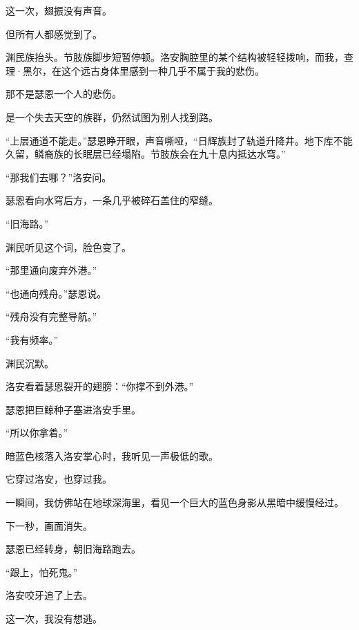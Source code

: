 这一次，翅振没有声音。

但所有人都感觉到了。

渊民族抬头。节肢族脚步短暂停顿。洛安胸腔里的某个结构被轻轻拨响，而我，查理·黑尔，在这个远古身体里感到一种几乎不属于我的悲伤。

那不是瑟恩一个人的悲伤。

是一个失去天空的族群，仍然试图为别人找到路。

“上层通道不能走。”瑟恩睁开眼，声音嘶哑，“日辉族封了轨道升降井。地下库不能久留，鳞裔族的长眠层已经塌陷。节肢族会在九十息内抵达水穹。”

“那我们去哪？”洛安问。

瑟恩看向水穹后方，一条几乎被碎石盖住的窄缝。

“旧海路。”

渊民听见这个词，脸色变了。

“那里通向废弃外港。”

“也通向残舟。”瑟恩说。

“残舟没有完整导航。”

“我有频率。”

渊民沉默。

洛安看着瑟恩裂开的翅膀：“你撑不到外港。”

瑟恩把巨鲸种子塞进洛安手里。

“所以你拿着。”

暗蓝色核落入洛安掌心时，我听见一声极低的歌。

它穿过洛安，也穿过我。

一瞬间，我仿佛站在地球深海里，看见一个巨大的蓝色身影从黑暗中缓慢经过。

下一秒，画面消失。

瑟恩已经转身，朝旧海路跑去。

“跟上，怕死鬼。”

洛安咬牙追了上去。

这一次，我没有想逃。
